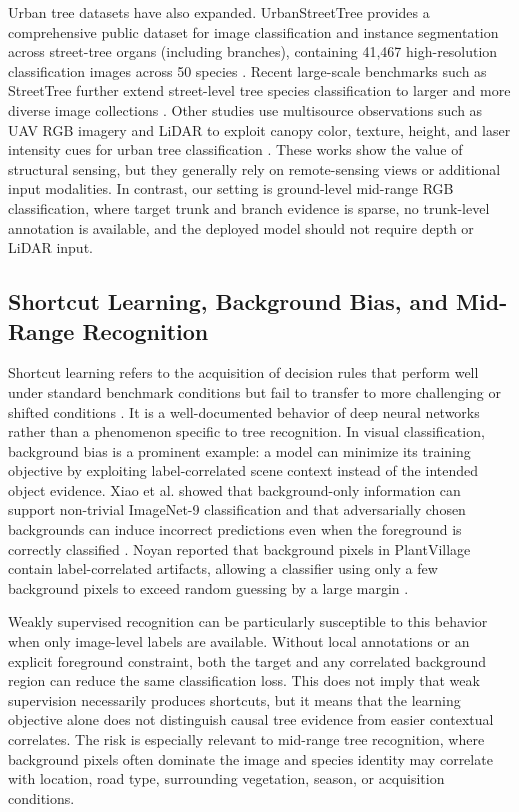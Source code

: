 \documentclass{ieeeaccess}
\begin{document}
Urban tree datasets have also expanded. UrbanStreetTree provides a comprehensive public dataset for
image classification and instance segmentation across street-tree organs (including branches),
containing 41,467 high-resolution classification images across 50 species \cite{urbanstreettree}.
Recent large-scale benchmarks such as StreetTree further extend street-level tree species
classification to larger and more diverse image collections \cite{streettree}. Other studies use
multisource observations such as UAV RGB imagery and LiDAR to exploit canopy color, texture, height,
and laser intensity cues for urban tree classification \cite{uavlidar}. These works show the value
of structural sensing, but they generally rely on remote-sensing views or additional input
modalities. In contrast, our setting is ground-level mid-range RGB classification, where target
trunk and branch evidence is sparse, no trunk-level annotation is available, and the deployed model
should not require depth or LiDAR input.

\subsection{Shortcut Learning, Background Bias, and Mid-Range Recognition}
\label{sec:shortcut_related}
Shortcut learning refers to the acquisition of decision rules that perform well under standard
benchmark conditions but fail to transfer to more challenging or shifted conditions
\cite{shortcutlearning}. It is a well-documented behavior of deep neural networks rather than a
phenomenon specific to tree recognition. In visual classification, background bias is a prominent
example: a model can minimize its training objective by exploiting label-correlated scene context
instead of the intended object evidence. Xiao et al. showed that
background-only information can support non-trivial ImageNet-9 classification and that adversarially
chosen backgrounds can induce incorrect predictions even when the foreground is correctly classified
\cite{backgroundbias}. Noyan reported that background pixels in PlantVillage contain
label-correlated artifacts, allowing a classifier using only a few background pixels to exceed
random guessing by a large margin \cite{plantvillagebias}.

Weakly supervised recognition can be particularly susceptible to this behavior when only image-level
labels are available. Without local annotations or an explicit foreground constraint, both the target
and any correlated background region can reduce the same classification loss. This does not imply
that weak supervision necessarily produces shortcuts, but it means that the learning objective alone
does not distinguish causal tree evidence from easier contextual correlates. The risk is especially
relevant to mid-range tree recognition, where background pixels often dominate the image and species
identity may correlate with location, road type, surrounding vegetation, season, or acquisition
conditions.
\end{document}
